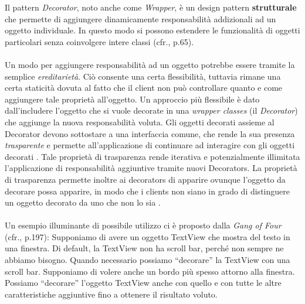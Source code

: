 \documentclass[12pt]{article}
\begin{document}
Il pattern {\em Decorator}, noto anche come {\em Wrapper}, è un design pattern \textbf{strutturale} che permette di aggiungere dinamicamente responsabilità addizionali ad un oggetto individuale. In questo modo si possono estendere le funzionalità di oggetti particolari senza coinvolgere intere classi (cfr.\cite{gof_sunt}, p.65).
\\
\\
Un modo per aggiungere responsabilità ad un oggetto potrebbe essere tramite la semplice {\em ereditarietà}. Ciò consente una certa flessibilità, tuttavia rimane una certa staticità dovuta al fatto che il client non può controllare quanto e come aggiungere tale proprietà all'oggetto.
Un approccio più flessibile è dato dall'includere l'oggetto che si vuole decorate in una {\em wrapper classes} (il {\em Decorator}) che aggiunge la nuova responsabilità voluta. Gli oggetti decorati assieme al Decorator devono sottostare a una interfaccia comune, che rende la sua presenza {\em trasparente} e permette all’applicazione di continuare ad interagire con gli oggetti decorati \cite{gof_sunt}. Tale proprietà di trasparenza rende iterativa e potenzialmente illimitata l'applicazione di responsabilità aggiuntive tramite nuovi Decorators.
La proprietà di trasparenza permette inoltre ai decorators di apparire ovunque l'oggetto da decorare possa apparire, in modo che i clients non siano in grado di distinguere un oggetto decorato da uno che non lo sia \cite{gof_riferimento}.
\\
\\
Un esempio illuminante di possibile utilizzo ci è proposto dalla {\em Gang of Four} (cfr.\cite{gof_riferimento}, p.197):
Supponiamo di avere un oggetto TextView che mostra del testo in una finestra. Di default, la TextView non ha scroll bar, perch\'e non sempre ne abbiamo bisogno. Quando necessario possiamo ``decorare'' la TextView con una scroll bar. Supponiamo di volere anche un bordo più spesso attorno alla finestra. Possiamo ``decorare'' l'oggetto TextView anche con quello e con tutte le altre caratteristiche aggiuntive fino a ottenere il risultato voluto.
\end{document}
